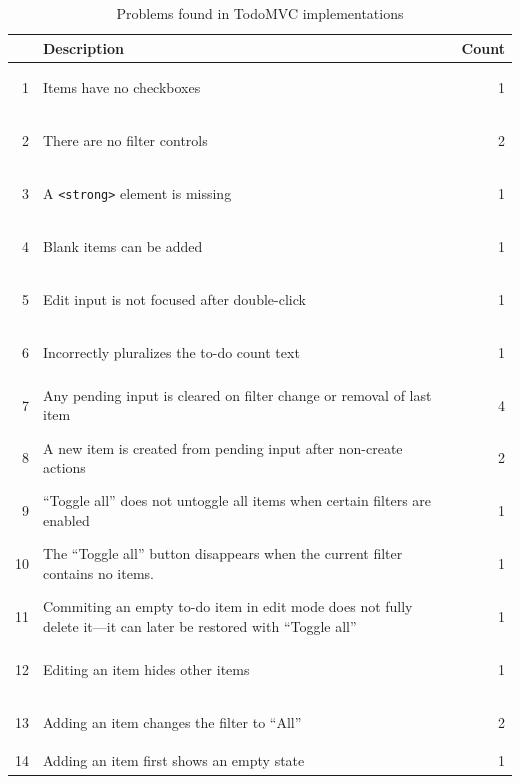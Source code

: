 \documentclass[sigplan,nonacm,10pt]{acmart}
\begin{document}
\begin{table}
  \begin{tabular}{|r|p{6cm}|r|}\hline
    & \textbf{Description} & \textbf{Count} \\\hline
    \hypertarget{p5}{1}&  Items have no checkboxes& 1\\\hline
    \hypertarget{p6}{2}& There are no filter controls& 2 \\\hline
    \hypertarget{p8}{3}& A \texttt{<strong>} element is missing& 1\\\hline
    \hypertarget{p1}{4}& Blank items can be added & 1 \\\hline
    \hypertarget{p3}{5}&  Edit input is not focused after double-click& 1 \\\hline
    \hypertarget{p10}{6}& Incorrectly pluralizes the to-do count text& 1\\\hline
    \hypertarget{p4}{7}& Any pending input is cleared on filter change or removal of last item& 4\\\hline
    \hypertarget{p7}{8}& A new item is created from pending input after non-create actions& 2\\\hline
    \hypertarget{p2}{9}& ``Toggle all'' does not untoggle all items when certain filters are enabled& 1\\\hline%
    \hypertarget{p12}{10}& The ``Toggle all'' button disappears when the current filter contains no items. & 1\\\hline
    \hypertarget{p9}{11}& Commiting an empty to-do item in edit mode does not fully delete it---it can later be restored with ``Toggle all''& 1\\\hline
    \hypertarget{p13}{12}& Editing an item hides other items& 1\\\hline
    \hypertarget{p14}{13}& Adding an item changes the filter to ``All''& 2\\\hline
    \cellcolor[HTML]{F0F0F0}\hypertarget{p11}{14}& \cellcolor[HTML]{F0F0F0}Adding an item first shows an empty state& \cellcolor[HTML]{F0F0F0}1\\\hline
  \end{tabular}
  \caption{Problems found in TodoMVC implementations}
  \label{tbl:Problems}
\end{table}
\end{document}
